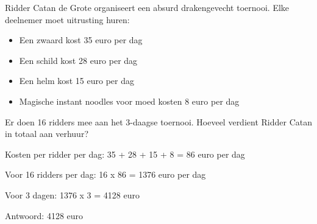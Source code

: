\begin{opgave}
Ridder Catan de Grote organiseert een absurd drakengevecht toernooi. Elke 
deelnemer moet uitrusting huren:
\begin{itemize}
\item Een zwaard kost 35 euro per dag
\item Een schild kost 28 euro per dag
\item Een helm kost 15 euro per dag
\item Magische instant noodles voor moed kosten 8 euro per dag
\end{itemize}
Er doen 16 ridders mee aan het 3-daagse toernooi. Hoeveel verdient Ridder 
Catan in totaal aan verhuur?
\end{opgave}

\begin{oplossing}
Kosten per ridder per dag:
35 + 28 + 15 + 8 = 86 euro per dag

Voor 16 ridders per dag:
16 x 86 = 1376 euro per dag

Voor 3 dagen:
1376 x 3 = 4128 euro

Antwoord: 4128 euro
\end{oplossing}